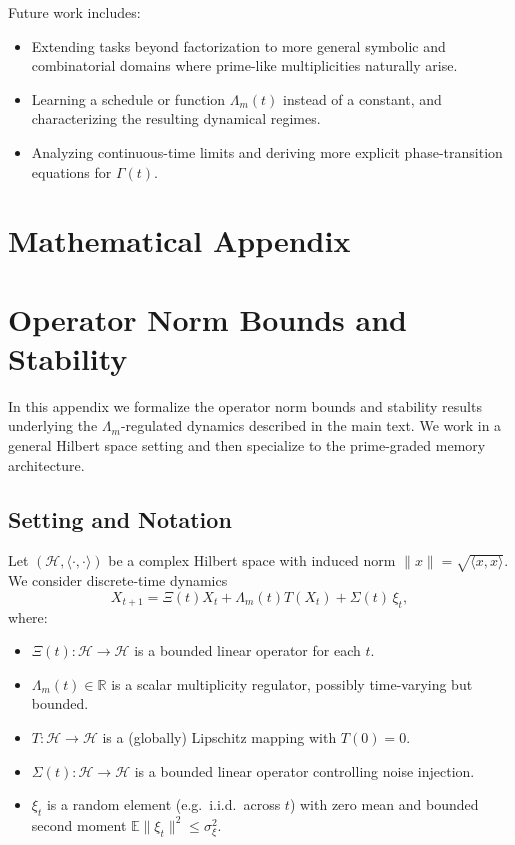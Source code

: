 \documentclass[11pt]{article}
\begin{document}
Future work includes:
\begin{itemize}[leftmargin=1.5em]
\item Extending tasks beyond factorization to more general symbolic and combinatorial domains where prime-like multiplicities naturally arise.
\item Learning a schedule or function $\Lambda_m(t)$ instead of a constant, and characterizing the resulting dynamical regimes.
\item Analyzing continuous-time limits and deriving more explicit phase-transition equations for $\Gamma(t)$.
\end{itemize}

\appendix
\section*{Mathematical Appendix}

\section{Operator Norm Bounds and Stability}

In this appendix we formalize the operator norm bounds and stability results underlying the $\Lambda_m$-regulated dynamics described in the main text. We work in a general Hilbert space setting and then specialize to the prime-graded memory architecture.

\subsection{Setting and Notation}

Let $(\mathcal{H},\langle\cdot,\cdot\rangle)$ be a complex Hilbert space with induced norm $\|x\| = \sqrt{\langle x,x\rangle}$. We consider discrete-time dynamics
\begin{equation}
X_{t+1} = \Xi(t) X_t + \Lambda_m(t) T(X_t) + \Sigma(t)\,\xi_t,
\label{eq:dyn-general}
\end{equation}
where:
\begin{itemize}
\item $\Xi(t):\mathcal{H}\to\mathcal{H}$ is a bounded linear operator for each $t$.
\item $\Lambda_m(t)\in\mathbb{R}$ is a scalar multiplicity regulator, possibly time-varying but bounded.
\item $T:\mathcal{H}\to\mathcal{H}$ is a (globally) Lipschitz mapping with $T(0)=0$.
\item $\Sigma(t):\mathcal{H}\to\mathcal{H}$ is a bounded linear operator controlling noise injection.
\item $\xi_t$ is a random element (e.g.\ i.i.d.\ across $t$) with zero mean and bounded second moment $\mathbb{E}\|\xi_t\|^2\le \sigma_\xi^2$.
\end{itemize}
\end{document}

